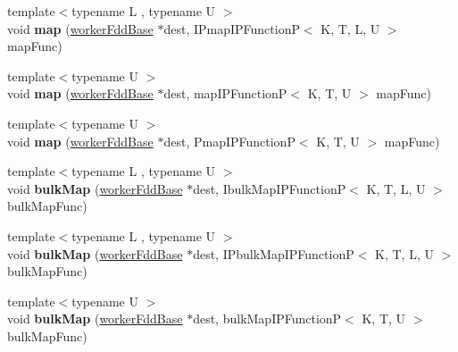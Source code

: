 \begin{DoxyCompactItemize}
{\footnotesize template$<$typename L , typename U $>$ }\\void {\bfseries map} (\hyperlink{classfaster_1_1workerFddBase}{worker\+Fdd\+Base} $\ast$dest, I\+Pmap\+I\+P\+FunctionP$<$ K, T, L, U $>$ map\+Func)
\item 
\hypertarget{classfaster_1_1__workerIFdd_a1370b613f6bcd5113be986d45a5a7f6a}{}\label{classfaster_1_1__workerIFdd_a1370b613f6bcd5113be986d45a5a7f6a} 
{\footnotesize template$<$typename U $>$ }\\void {\bfseries map} (\hyperlink{classfaster_1_1workerFddBase}{worker\+Fdd\+Base} $\ast$dest, map\+I\+P\+FunctionP$<$ K, T, U $>$ map\+Func)
\item 
\hypertarget{classfaster_1_1__workerIFdd_aacd4131321c22e4cb621a0378590c218}{}\label{classfaster_1_1__workerIFdd_aacd4131321c22e4cb621a0378590c218} 
{\footnotesize template$<$typename U $>$ }\\void {\bfseries map} (\hyperlink{classfaster_1_1workerFddBase}{worker\+Fdd\+Base} $\ast$dest, Pmap\+I\+P\+FunctionP$<$ K, T, U $>$ map\+Func)
\item 
\hypertarget{classfaster_1_1__workerIFdd_af615ca291ae54700159a46bafb170217}{}\label{classfaster_1_1__workerIFdd_af615ca291ae54700159a46bafb170217} 
{\footnotesize template$<$typename L , typename U $>$ }\\void {\bfseries bulk\+Map} (\hyperlink{classfaster_1_1workerFddBase}{worker\+Fdd\+Base} $\ast$dest, Ibulk\+Map\+I\+P\+FunctionP$<$ K, T, L, U $>$ bulk\+Map\+Func)
\item 
\hypertarget{classfaster_1_1__workerIFdd_ad273de2e3d16220c260d57a56ac66b8c}{}\label{classfaster_1_1__workerIFdd_ad273de2e3d16220c260d57a56ac66b8c} 
{\footnotesize template$<$typename L , typename U $>$ }\\void {\bfseries bulk\+Map} (\hyperlink{classfaster_1_1workerFddBase}{worker\+Fdd\+Base} $\ast$dest, I\+Pbulk\+Map\+I\+P\+FunctionP$<$ K, T, L, U $>$ bulk\+Map\+Func)
\item 
\hypertarget{classfaster_1_1__workerIFdd_af5248951f3ceb15dbb64eeeb51d21582}{}\label{classfaster_1_1__workerIFdd_af5248951f3ceb15dbb64eeeb51d21582} 
{\footnotesize template$<$typename U $>$ }\\void {\bfseries bulk\+Map} (\hyperlink{classfaster_1_1workerFddBase}{worker\+Fdd\+Base} $\ast$dest, bulk\+Map\+I\+P\+FunctionP$<$ K, T, U $>$ bulk\+Map\+Func)
\item 
\hypertarget{classfaster_1_1__workerIFdd_ac9f95a47678e286a47dfb3b554d6d700}{}\label{classfaster_1_1__workerIFdd_ac9f95a47678e286a47dfb3b554d6d700} 

\end{DoxyCompactItemize}
